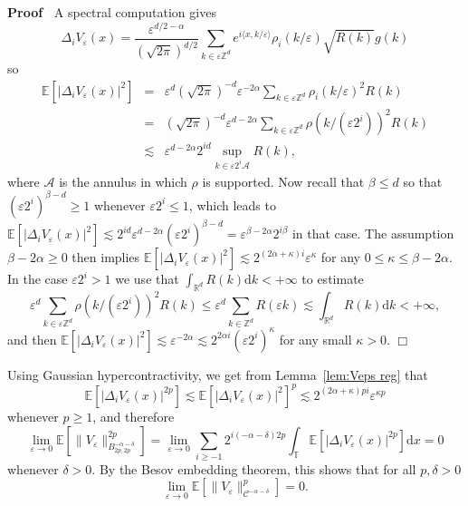 \documentclass[a4paper,11pt]{article}
\newcommand{\mathd}{\mathrm{d}}
\newenvironment{proof}{\noindent\textbf{Proof\ }}{\hspace*{\fill}$\Box$\medskip}
\newcommand{\CA}{\mathscr{A}}
\newcommand{\CC}{\mathscr{C}}
\newcommand{\R}{\mathbb{R}}
\begin{document}
\begin{proof}
  A spectral computation gives
  \[ \Delta_i V_{\varepsilon} (x) = \frac{\varepsilon^{d / 2 - \alpha}}{(
     \sqrt{2 \pi} )^{d / 2}} \sum_{k \in \varepsilon \mathbb{Z}^d}
     e^{i \langle x, k / \varepsilon \rangle} \rho_i (k / \varepsilon) \sqrt{R
     (k)} g (k) \]
  so
  \begin{equation}
    \begin{array}{lll}
      \mathbb{E} [| \Delta_i V_{\varepsilon} (x) |^2] & = & \varepsilon^d
      ( \sqrt{2 \pi} )^{-d} \varepsilon^{- 2 \alpha} \sum_{k \in
      \varepsilon \mathbb{Z}^d} \rho_i (k / \varepsilon)^2 R (k)\\
      & = & ( \sqrt{2 \pi} )^{-d} \varepsilon^{d - 2 \alpha} \sum_{k
      \in \varepsilon \mathbb{Z}^d} \rho (k / (\varepsilon 2^i))^2 R (k)\\
      & \lesssim & \varepsilon^{d - 2 \alpha} 2^{id} \sup_{k \in \varepsilon
      2^i \CA} R (k),
    \end{array} \label{eq:est-lp-v}
  \end{equation}
  where $\CA$ is the annulus in which $\rho$ is supported. Now recall that $\beta \le d$ so that $(\varepsilon
  2^i)^{\beta-d}\ge1$ whenever $\varepsilon
  2^i \leqslant 1$, which leads to $\mathbb{E} [| \Delta_i V_{\varepsilon} (x) |^2]
  \lesssim 2^{id} \varepsilon^{d - 2 \alpha} (\varepsilon 2^i)^{\beta - d} =
  \varepsilon^{\beta - 2 \alpha} 2^{i \beta}$ in that case. The assumption $\beta - 2
  \alpha \geqslant 0$ then implies $\mathbb{E} [| \Delta_i V_{\varepsilon}
  (x) |^2] \lesssim 2^{(2 \alpha + \kappa) i} \varepsilon^{\kappa}$ for any $0
  \leqslant \kappa \leqslant \beta - 2 \alpha$. In the case $\varepsilon 2^i >
  1$ we use that $\int_{\R^d} R (k) \mathd k < + \infty$ to estimate
  \[ \varepsilon^d \sum_{k \in \varepsilon \mathbb{Z}^d} \rho (k /
     (\varepsilon 2^i))^2 R (k) \leqslant \varepsilon^d \sum_{k \in
     \mathbb{Z}^d} R (\varepsilon k) \lesssim \int_{\mathbb{R}^d} R (k)
     \mathd k < + \infty, \]
  and then $\mathbb{E} [| \Delta_i V_{\varepsilon} (x) |^2] \lesssim
  \varepsilon^{- 2 \alpha} \lesssim 2^{2 \alpha i} (\varepsilon 2^i)^{\kappa}$
  for any small $\kappa > 0$. 
\end{proof}

\begin{remark}
   Using Gaussian hypercontractivity, we get from Lemma~\ref{lem:Veps reg} that
   \[
      \mathbb{E} [| \Delta_i V_{\varepsilon} (x) |^{2p}] \lesssim \mathbb{E} [| \Delta_i V_{\varepsilon} (x) |^{2}]^p \lesssim 2^{(2 \alpha +  \kappa) p i} \varepsilon^{\kappa p}
   \]
   whenever $p \ge 1$, and therefore
   \[
      \lim_{\varepsilon \to 0} \mathbb{E} [ \| V_{\varepsilon} \|^{2p}_{B_{2p,2p}^{- \alpha - \delta}} ] = \lim_{\varepsilon \to 0} \sum_{i \ge -1} 2^{i(-\alpha-\delta)2p} \int_\mathbb{T} \mathbb{E} [| \Delta_i V_{\varepsilon} (x) |^{2p}] \mathd x = 0
   \]
   whenever $\delta > 0$. By the Besov embedding theorem, this shows that for all $p,\delta > 0$
   \[
      \lim_{\varepsilon \to 0} \mathbb{E} [ \| V_{\varepsilon} \|^{p}_{\CC^{- \alpha - \delta}} ] = 0.
   \]
\end{remark}
\end{document}
